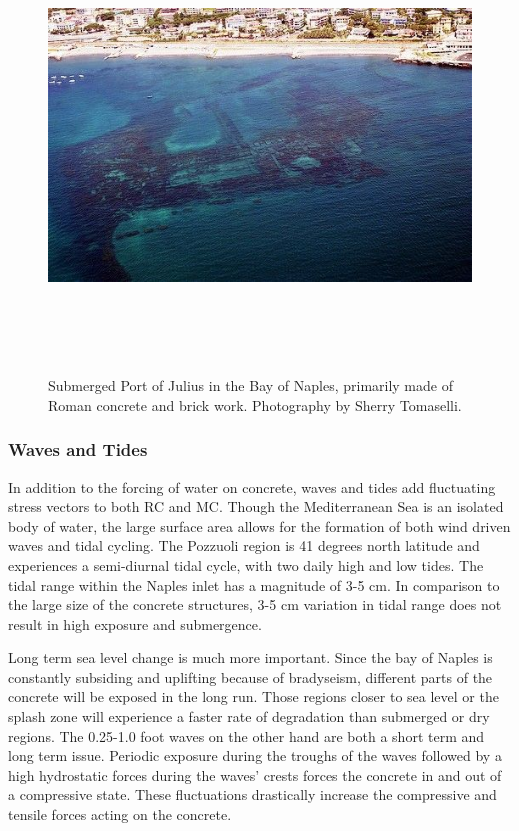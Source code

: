 \documentclass[12pt]{article}
\begin{document}
\begin{figure}[ht]
  \includegraphics[width=\textwidth,height=12cm]{port_julius.jpg}
  \caption{Submerged Port of Julius in the Bay of Naples, primarily made of Roman concrete and brick work. Photography by Sherry Tomaselli.}
\end{figure}

\subsubsection*{Waves and Tides}

In addition to the forcing of water on concrete, waves and tides add fluctuating stress vectors to both RC and MC. Though the Mediterranean Sea is an isolated body of water, the large surface area allows for the formation of both wind driven waves and tidal cycling. The Pozzuoli region is 41 degrees north latitude and experiences a semi-diurnal tidal cycle, with two daily high and low tides. The tidal range within the Naples inlet has a magnitude of 3-5 cm. In comparison to the large size of the concrete structures, 3-5 cm variation in tidal range does not result in high exposure and submergence. 

Long term sea level change is much more important. Since the bay of Naples is constantly subsiding and uplifting because of bradyseism, different parts of the concrete will be exposed in the long run. Those regions closer to sea level or the splash zone will experience a faster rate of degradation than submerged or dry regions. The 0.25-1.0 foot waves on the other hand are both a short term and long term issue. Periodic exposure during the troughs of the waves followed by a high hydrostatic forces during the waves’ crests forces the concrete in and out of a compressive state. These fluctuations drastically increase the compressive and tensile forces acting on the concrete. 
\end{document}
